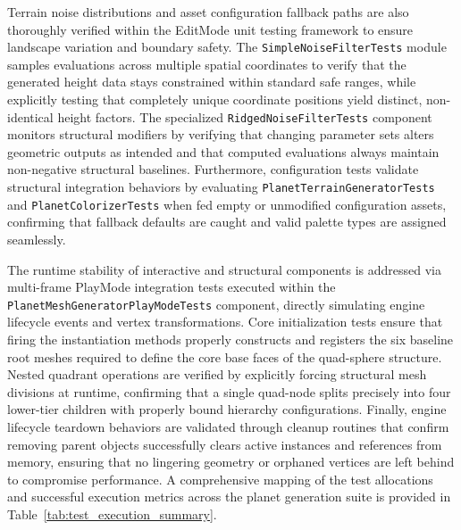 \documentclass[12pt]{report}
\begin{document}
Terrain noise distributions and asset configuration fallback paths are also thoroughly verified within the EditMode unit testing framework to ensure landscape variation and boundary safety. The \texttt{SimpleNoiseFilterTests} module samples evaluations across multiple spatial coordinates to verify that the generated height data stays constrained within standard safe ranges, while explicitly testing that completely unique coordinate positions yield distinct, non-identical height factors. The specialized \texttt{RidgedNoiseFilterTests} component monitors structural modifiers by verifying that changing parameter sets alters geometric outputs as intended and that computed evaluations always maintain non-negative structural baselines. Furthermore, configuration tests validate structural integration behaviors by evaluating \texttt{PlanetTerrainGeneratorTests} and \texttt{PlanetColorizerTests} when fed empty or unmodified configuration assets, confirming that fallback defaults are caught and valid palette types are assigned seamlessly.

The runtime stability of interactive and structural components is addressed via multi-frame PlayMode integration tests executed within the \texttt{PlanetMeshGeneratorPlayModeTests} component, directly simulating engine lifecycle events and vertex transformations. Core initialization tests ensure that firing the instantiation methods properly constructs and registers the six baseline root meshes required to define the core base faces of the quad-sphere structure. Nested quadrant operations are verified by explicitly forcing structural mesh divisions at runtime, confirming that a single quad-node splits precisely into four lower-tier children with properly bound hierarchy configurations. Finally, engine lifecycle teardown behaviors are validated through cleanup routines that confirm removing parent objects successfully clears active instances and references from memory, ensuring that no lingering geometry or orphaned vertices are left behind to compromise performance. A comprehensive mapping of the test allocations and successful execution metrics across the planet generation suite is provided in Table~\ref{tab:test_execution_summary}.
\end{document}

